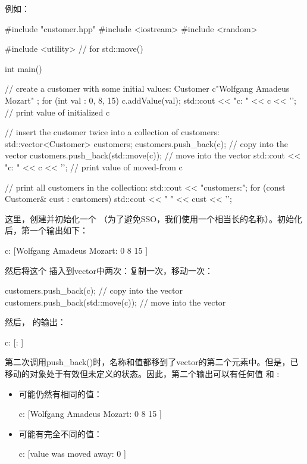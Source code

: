 例如：

\begin{cppcode}
#include "customer.hpp"
#include <iostream>
#include <random>

#include <utility> // for std::move()

int main()
{
	// create a customer with some initial values:
	Customer c{"Wolfgang Amadeus Mozart" };
	for (int val : {0, 8, 15}) {
		c.addValue(val);
	}
	std::cout << "c: " << c << '\n'; // print value of initialized c

	// insert the customer twice into a collection of customers:
	std::vector<Customer> customers;
	customers.push_back(c); // copy into the vector
	customers.push_back(std::move(c)); // move into the vector
	std::cout << "c: " << c << '\n'; // print value of moved-from c

	// print all customers in the collection:
	std::cout << "customers:\n";
	for (const Customer& cust : customers) {
		std::cout << " " << cust << '\n';
	}
}
\end{cppcode}

这里，创建并初始化一个 （为了避免SSO，我们使用一个相当长的名称）。初始化  后，第一个输出如下：

\begin{outputcode}
c: [Wolfgang Amadeus Mozart: 0 8 15 ]
\end{outputcode}

然后将这个  插入到vector中两次：复制一次，移动一次：

\begin{cppcode}
customers.push_back(c); // copy into the vector
customers.push_back(std::move(c)); // move into the vector
\end{cppcode}

然后， 的输出：

\begin{outputcode}
c: [: ]
\end{outputcode}

第二次调用push_back()时，名称和值都移到了vector的第二个元素中。但是，已移动的对象处于有效但未定义的状态。因此，第二个输出可以有任何值  和 :

\begin{itemize}
	\item 可能仍然有相同的值：

	\begin{outputcode}
c: [Wolfgang Amadeus Mozart: 0 8 15 ]
	\end{outputcode}
	\item 可能有完全不同的值：

	\begin{outputcode}
c: [value was moved away: 0 ]
	\end{outputcode}
\end{itemize}


